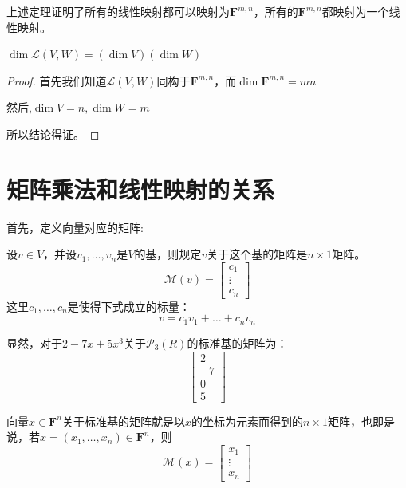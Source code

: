 \documentclass[10pt,a4paper,UTF8]{article}
\begin{document}
上述定理证明了所有的线性映射都可以映射为\(\mathbf{F}^{m,n}\)，所有的\(\mathbf{F}^{m,n}\)都映射为一个线性映射。
\begin{theorem}
\(\dim \mathcal{L}(V,W) = (\dim V)(\dim W)\)
\end{theorem}
\begin{proof}
首先我们知道\(\mathcal{L}(V,W)\)同构于\(\mathbf{F}^{m,n}\)，而\(\dim \mathbf{F}^{m,n} = mn\)

然后,\(\dim V = n,\dim W = m\) 

所以结论得证。
\end{proof}

\section{矩阵乘法和线性映射的关系}
\label{sec:orgd56a2a5}


首先，定义向量对应的矩阵:
\begin{definition}
设\(v\in V\)，并设\(v_{1},\ldots ,v_{n}\)是\(V\)的基，则规定\(v\)关于这个基的矩阵是\(n\times 1\)矩阵。
\begin{equation}
\label{eq:201703252}
\mathcal{M}(v) = 
\begin{bmatrix}
c_{1} \\ 
\vdots \\
c_{n}
\end{bmatrix}
\end{equation}
这里\(c_{1},\ldots ,c_{n}\)是使得下式成立的标量：
\[v=c_{1}v_{1}+ \ldots + c_{n}v_{n}\] 
\end{definition}

显然，对于\(2-7x+5x^{3}\)关于\(\mathcal{P}_{3}(R)\)的标准基的矩阵为：
\begin{equation}
\label{eq:201703251}
\begin{bmatrix}
2 \\ -7 \\ 0 \\ 5
\end{bmatrix}
\end{equation}

向量\(x\in \mathbf{F}^{n}\)关于标准基的矩阵就是以\(x\)的坐标为元素而得到的\(n\times 1\)矩阵，也即是说，若\(x=(x_{1},\ldots ,x_{n})\in \mathbf{F}^{n}\)，则
\begin{equation}
\label{eq:201703253}
\mathcal{M}(x) = 
\begin{bmatrix}
x_{1} \\ \vdots \\ x_{n}
\end{bmatrix}
\end{equation}
\end{document}
